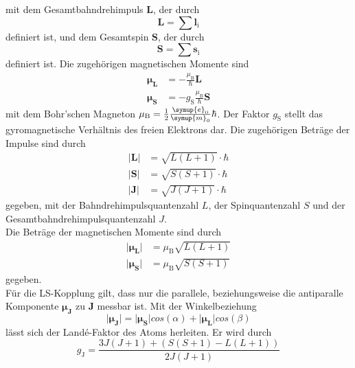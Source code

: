     mit dem Gesamtbahndrehimpuls $\symbf{L}$, der durch
    \begin{equation*}
        \symbf{L} = \sum \symbf{l}_\text{i}
    \end{equation*}
    definiert ist,
    und dem Gesamtspin $\symbf{S}$, der durch
    \begin{equation*}
        \symbf{S} = \sum \symbf{s}_\text{i}
    \end{equation*}
    definiert ist.
    Die zugehörigen magnetischen Momente sind
    \begin{align*}
        \symbf{\mu_\text{L}} &= - \frac{\mu_\text{B}}{\hbar} \symbf{L} \\
        \symbf{\mu_\text{S}} &= - g_\text{S} \frac{\mu_\text{B}}{\hbar} \symbf{S}
    \end{align*}
    mit dem Bohr'schen Magneton $\mu_\text{B} = \frac{1}{2} \frac{\symup{e}_0}{\symup{m}_0} \hbar$.
    Der Faktor $g_\text{S}$ stellt das gyromagnetische Verhältnis des freien Elektrons dar.
    Die zugehörigen Beträge der Impulse sind durch
    \begin{align*}
        \lvert \symbf{L} \rvert &= \sqrt{L(L+1)} \cdot \hbar \\
        \lvert \symbf{S} \rvert &= \sqrt{S(S+1)} \cdot \hbar \\
        \lvert \symbf{J} \rvert &= \sqrt{J(J+1)} \cdot \hbar
    \end{align*}
    gegeben,
    mit der Bahndrehimpulsquantenzahl $L$,
    der Spinquantenzahl $S$ und der Gesamtbahndrehimpulsquantenzahl $J$. \\
    Die Beträge der magnetischen Momente sind durch
    \begin{align*}
        \lvert \symbf{\mu_\text{L}} \rvert &= \mu_\text{B} \sqrt{L(L+1)} \\
        \lvert \symbf{\mu_\text{S}} \rvert &= \mu_\text{B} \sqrt{S(S+1)}
    \end{align*}
    gegeben. \\
    Für die LS-Kopplung gilt,
    dass nur die parallele,
    beziehungsweise die antiparalle Komponente $\symbf{\mu_\text{J}}$ zu $\symbf{J}$ messbar ist.
    Mit der Winkelbeziehung
    \begin{equation*}
        \lvert \symbf{\mu_\text{J}} \rvert = \lvert \symbf{\mu_\text{S}} \rvert cos(\alpha) + \lvert \symbf{\mu_\text{L}} \rvert cos(\beta)
    \end{equation*}
    lässt sich der Landé-Faktor des Atoms herleiten.
    Er wird durch
    \begin{equation}
        \label{eqn:Lande_Faktor}
        g_\text{J} = \frac{3J(J+1) + (S(S+1) - L(L+1))}{2J(J+1)}
    \end{equation}
